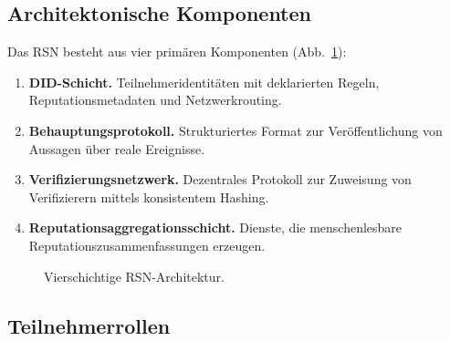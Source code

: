 \documentclass[11pt,a4paper,twocolumn]{article}
\begin{document}
\subsection{Architektonische Komponenten}

Das RSN besteht aus vier primären Komponenten (Abb.~\ref{fig:architecture}):
\begin{enumerate}[nosep]
\item \textbf{DID-Schicht.} Teilnehmeridentitäten mit deklarierten Regeln, Reputationsmetadaten und Netzwerkrouting.
\item \textbf{Behauptungsprotokoll.} Strukturiertes Format zur Veröffentlichung von Aussagen über reale Ereignisse.
\item \textbf{Verifizierungsnetzwerk.} Dezentrales Protokoll zur Zuweisung von Verifizierern mittels konsistentem Hashing.
\item \textbf{Reputationsaggregationsschicht.} Dienste, die menschenlesbare Reputationszusammenfassungen erzeugen.
\end{enumerate}

\begin{figure}[ht]
\centering
{}
\caption{Vierschichtige RSN-Architektur.}
\label{fig:architecture}
\end{figure}

\subsection{Teilnehmerrollen}
\end{document}
